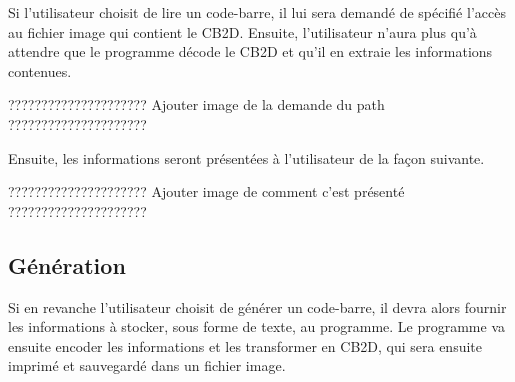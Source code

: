 Si l'utilisateur choisit de lire un code-barre, il lui sera demandé de spécifié l'accès au fichier image qui contient le CB2D. Ensuite, l'utilisateur n'aura plus qu'à attendre que le programme décode le CB2D et qu'il en extraie les informations contenues.

????????????????????? Ajouter image de la demande du path ?????????????????????

Ensuite, les informations seront présentées à l'utilisateur de la façon suivante.

????????????????????? Ajouter image de comment c'est présenté ?????????????????????

\subsection{Génération}

Si en revanche l'utilisateur choisit de générer un code-barre, il devra alors fournir les informations à stocker, sous forme de texte, au programme. Le programme va ensuite encoder les informations et les transformer en CB2D, qui sera ensuite imprimé et sauvegardé dans un fichier image.
